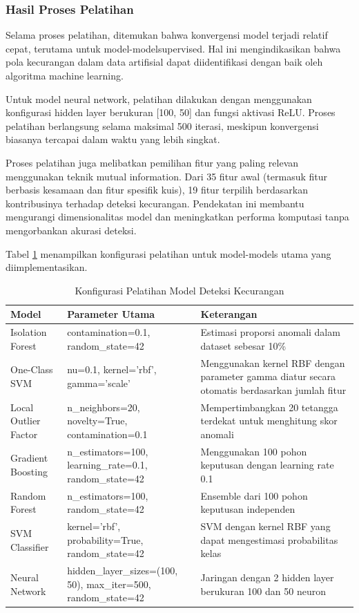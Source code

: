 \subsubsection{Hasil Proses Pelatihan}

Selama proses pelatihan, ditemukan bahwa konvergensi model terjadi relatif cepat, terutama untuk model-modelsupervised. Hal ini mengindikasikan bahwa pola kecurangan dalam data artifisial dapat diidentifikasi dengan baik oleh algoritma machine learning.

Untuk model neural network, pelatihan dilakukan dengan menggunakan konfigurasi hidden layer berukuran [100, 50] dan fungsi aktivasi ReLU. Proses pelatihan berlangsung selama maksimal 500 iterasi, meskipun konvergensi biasanya tercapai dalam waktu yang lebih singkat. 

Proses pelatihan juga melibatkan pemilihan fitur yang paling relevan menggunakan teknik mutual information. Dari 35 fitur awal (termasuk fitur berbasis kesamaan dan fitur spesifik kuis), 19 fitur terpilih berdasarkan kontribusinya terhadap deteksi kecurangan. Pendekatan ini membantu mengurangi dimensionalitas model dan meningkatkan performa komputasi tanpa mengorbankan akurasi deteksi.

Tabel \ref{tabel:modelTrainingConfig} menampilkan konfigurasi pelatihan untuk model-models utama yang diimplementasikan.

\begin{table}[htbp]
\centering
\caption{Konfigurasi Pelatihan Model Deteksi Kecurangan}
\label{tabel:modelTrainingConfig}
\begin{tabular}{|l|p{4cm}|p{6cm}|}
\hline
\textbf{Model} & \textbf{Parameter Utama} & \textbf{Keterangan} \\
\hline
Isolation Forest & contamination=0.1, random\_state=42 & Estimasi proporsi anomali dalam dataset sebesar 10\% \\
\hline
One-Class SVM & nu=0.1, kernel='rbf', gamma='scale' & Menggunakan kernel RBF dengan parameter gamma diatur secara otomatis berdasarkan jumlah fitur \\
\hline
Local Outlier Factor & n\_neighbors=20, novelty=True, contamination=0.1 & Mempertimbangkan 20 tetangga terdekat untuk menghitung skor anomali \\
\hline
Gradient Boosting & n\_estimators=100, learning\_rate=0.1, random\_state=42 & Menggunakan 100 pohon keputusan dengan learning rate 0.1 \\
\hline
Random Forest & n\_estimators=100, random\_state=42 & Ensemble dari 100 pohon keputusan independen \\
\hline
SVM Classifier & kernel='rbf', probability=True, random\_state=42 & SVM dengan kernel RBF yang dapat mengestimasi probabilitas kelas \\
\hline
Neural Network & hidden\_layer\_sizes=(100, 50), max\_iter=500, random\_state=42 & Jaringan dengan 2 hidden layer berukuran 100 dan 50 neuron \\
\hline
\end{tabular}
\end{table}

